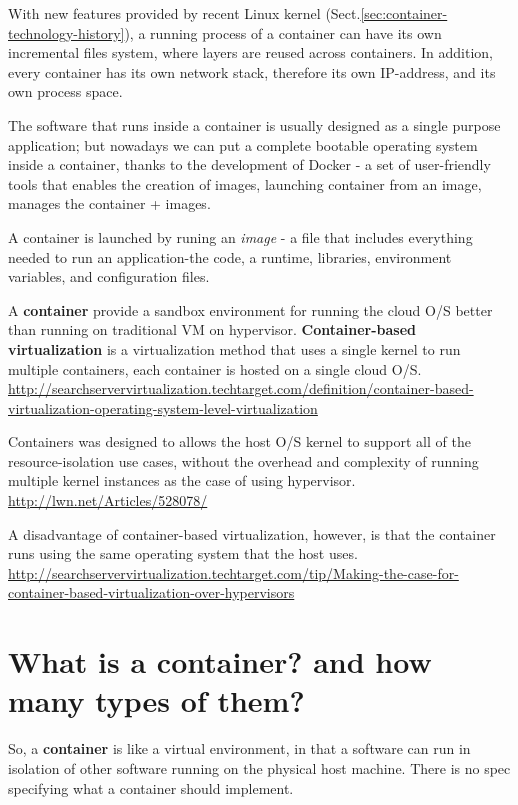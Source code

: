 With new features provided by recent Linux kernel
(Sect.\ref{sec:container-technology-history}), a running process of a container
can have its own incremental files system, where layers are reused across
containers. In addition, every container has its own network stack, therefore
its own IP-address, and its own process space.

The software that runs inside a container is usually designed as a single
purpose application; but nowadays we can put a complete bootable operating
system inside a container, thanks to the development of Docker - a set of
user-friendly tools that enables the creation of images, launching container
from an image, manages the container + images.
 
A container is launched by runing an {\it image} - a file  that includes
everything needed to run an application-the code, a runtime, libraries,
environment variables, and configuration files.

A {\bf container} provide a sandbox environment for running the cloud O/S better
than running on traditional VM on hypervisor. {\bf Container-based
virtualization} is a virtualization method that uses a single kernel to run
multiple containers, each container is hosted on a single cloud O/S.
\url{http://searchservervirtualization.techtarget.com/definition/container-based-virtualization-operating-system-level-virtualization}

Containers was designed to allows the host O/S kernel to support all of the
resource-isolation use cases, without the overhead and complexity of running
multiple kernel instances as the case of using hypervisor.
\url{http://lwn.net/Articles/528078/}

A disadvantage of container-based virtualization, however, is that the container
runs using the same operating system that the host uses.
\url{http://searchservervirtualization.techtarget.com/tip/Making-the-case-for-container-based-virtualization-over-hypervisors}

\section{What is a container? and how many types of them?}
\label{sec:containers_Linux}


So, a {\bf container} is like a virtual environment, in that a software can
run in isolation of other software running on the physical host machine.
There is no spec specifying what a container should implement.

